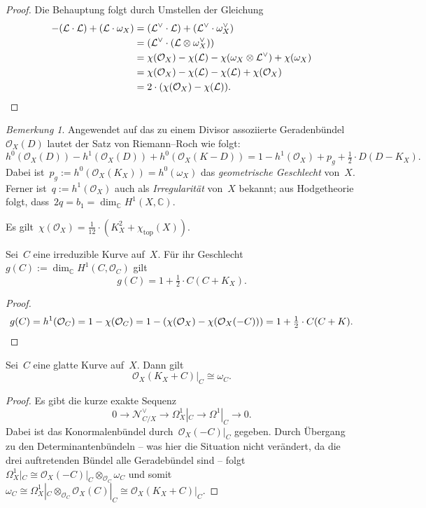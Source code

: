 \documentclass[a4paper,ngerman,12pt]{scrartcl}
\theoremstyle{definition}
\theoremstyle{plain}
\theoremstyle{remark}
\newtheorem{rem}[defn]{Bemerkung}
\newcommand{\CC}{\mathbb{C}}
\newcommand{\N}{\mathcal{N}}
\renewcommand{\L}{\mathcal{L}}
\renewcommand{\O}{\mathcal{O}}
\newcommand{\lra}{\longrightarrow}
\begin{document}
\begin{proof}Die Behauptung folgt durch Umstellen der Gleichung
\begin{align*}
  -(\L \cdot \L) + (\L \cdot \omega_X)
  &= (\L^\vee \cdot \L) + (\L^\vee \cdot \omega_X^\vee) \\
  &= (\L^\vee \cdot (\L \otimes \omega_X^\vee)) \\
  &= \chi(\O_X) - \chi(\L) - \chi(\omega_X \otimes \L^\vee) + \chi(\omega_X) \\
  &= \chi(\O_X) - \chi(\L) - \chi(\L) + \chi(\O_X) \\
  &= 2 \cdot (\chi(\O_X) - \chi(\L)). \qedhere
\end{align*}
\end{proof}

\begin{rem}Angewendet auf das zu einem Divisor assoziierte
Geradenbündel~$\O_X(D)$ lautet der Satz von Riemann--Roch wie folgt:
\[ h^0(\O_X(D)) - h^1(\O_X(D)) + h^0(\O_X(K-D)) =
  1 - h^1(\O_X) + p_g + \tfrac{1}{2} \cdot D(D-K_X). \]
Dabei ist~$p_g := h^0(\O_X(K_X)) = h^0(\omega_X)$ das \emph{geometrische
Geschlecht} von~$X$. Ferner ist~$q := h^1(\O_X)$ auch als \emph{Irregularität}
von~$X$ bekannt; aus Hodgetheorie folgt, dass~$2q = b_1 = \dim_\CC H^1(X,\CC)$.
\end{rem}

\begin{fact}
Es gilt~$\chi(\O_X) = \frac{1}{12} \cdot (K_X^2 +
\chi_\mathrm{top}(X))$.
\end{fact}

\begin{cor}
Sei~$C$ eine irreduzible Kurve auf~$X$. Für ihr Geschlecht $g(C) :=
\dim_\CC H^1(C,\O_C)$ gilt
\[ g(C) = 1 + \tfrac{1}{2} \cdot C(C+K_X). \]
\end{cor}
\begin{proof}\[ g(C) = h^1(\O_C) = 1 - \chi(\O_C) = 1 - (\chi(\O_X) -
\chi(\O_X(-C))) = 1 + \tfrac{1}{2} \cdot C(C+K). \qedhere \]
\end{proof}

\begin{prop}[Adjunktionsformel]
Sei~$C$ eine glatte Kurve auf~$X$. Dann gilt \[ \O_X(K_X+C)|_C \cong \omega_C. \]
\end{prop}
\begin{proof}Es gibt die kurze exakte Sequenz
\[ 0 \lra \N_{C/X}^\vee \lra \Omega^1_X|_C \lra \Omega^1|_C \lra 0. \]
Dabei ist das Konormalenbündel durch~$\O_X(-C)|_C$ gegeben. Durch Übergang zu
den Determinantenbündeln -- was hier die Situation nicht verändert, da die drei
auftretenden Bündel alle Geradebündel sind -- folgt~$\Omega^1_X|_C \cong
\O_X(-C)|_C \otimes_{\O_C} \omega_C$ und somit~$\omega_C \cong \Omega^1_X|_C
\otimes_{\O_C} \O_X(C)|_C \cong \O_X(K_X+C)|_C$.
\end{proof}

\end{document}
